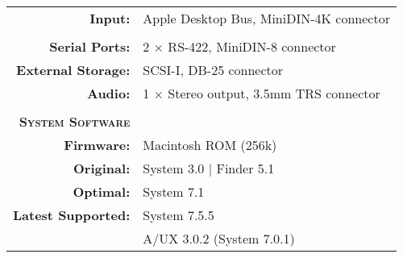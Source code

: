 \begin{tabular}{ r p{6in} }
\\
\textbf{Input:} & Apple Desktop Bus, MiniDIN-4K connector \\
\\
\textbf{Serial Ports:} & 2 \(\times\) RS-422, MiniDIN-8 connector \\
\textbf{External Storage:} & SCSI-I, DB-25 connector \\
\textbf{Audio:} & 1 \(\times\) Stereo output, 3.5mm TRS connector \\
\\
\textbf{\textsc{System Software}} & ~ \\
\textbf{Firmware:} & Macintosh ROM (256k) \\
\textbf{Original:} & System 3.0 | Finder 5.1 \\
\textbf{Optimal:} & System 7.1 \\
\textbf{Latest Supported:} & System 7.5.5 \\
~ & A/UX 3.0.2 (System 7.0.1) \\
\end{tabular}
